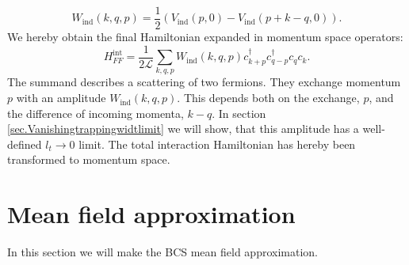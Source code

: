 \begin{equation}
W_{\text{ind}}(k, q, p) = \frac{1}{2}\left(V_\text{ind}\left( p, 0 \right) - V_\text{ind}\left( p + k - q, 0 \right) \right). 
\label{eq.Wkqp.scattering.amplitude}
\end{equation}
We hereby obtain the final Hamiltonian expanded in momentum space operators:
\begin{equation}
H^\text{int}_{FF} = \frac{1}{2\mathcal{L}} \sum_{k,q,p} W_{\text{ind}}(k, q, p) c^\dagger_{k+p} c^\dagger_{q-p} c_{q} c_{k}. 
\label{eq.HintMomentumSpace}
\end{equation}
The summand describes a scattering of two fermions. They exchange momentum $p$ with an amplitude $W_{\text{ind}}(k, q, p)$. This depends both on the exchange, $p$, and the difference of incoming momenta, $k - q$. In section \ref{sec.Vanishingtrappingwidtlimit} we will show, that this amplitude has a well-defined $l_t \to 0$ limit. The total interaction Hamiltonian has hereby been transformed to momentum space. 

\clearpage

\section{Mean field approximation} \label{sec.meanfieldapproximation}
In this section we will make the BCS mean field approximation. 

